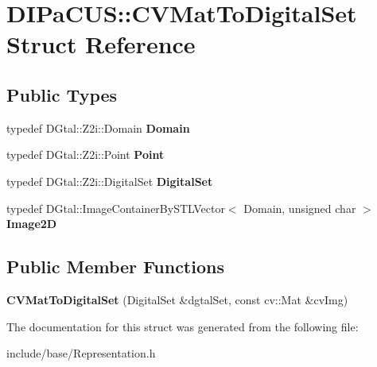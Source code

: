 \hypertarget{structDIPaCUS_1_1CVMatToDigitalSet}{}\section{D\+I\+Pa\+C\+US\+:\+:C\+V\+Mat\+To\+Digital\+Set Struct Reference}
\label{structDIPaCUS_1_1CVMatToDigitalSet}
\subsection*{Public Types}
\begin{DoxyCompactItemize}
\item 
\mbox{\label{structDIPaCUS_1_1CVMatToDigitalSet_ac8b0764da8c7668e5f1ca3d336d3f2de}} 
typedef D\+Gtal\+::\+Z2i\+::\+Domain {\bfseries Domain}
\item 
\mbox{\label{structDIPaCUS_1_1CVMatToDigitalSet_a8d29525418cf7a721290e9ad38bac822}} 
typedef D\+Gtal\+::\+Z2i\+::\+Point {\bfseries Point}
\item 
\mbox{\label{structDIPaCUS_1_1CVMatToDigitalSet_aa57ae4169b2ebbaa6af9ce9de89092e1}} 
typedef D\+Gtal\+::\+Z2i\+::\+Digital\+Set {\bfseries Digital\+Set}
\item 
\mbox{\label{structDIPaCUS_1_1CVMatToDigitalSet_af42f2253ec34d0da41c1938c0b0f1813}} 
typedef D\+Gtal\+::\+Image\+Container\+By\+S\+T\+L\+Vector$<$ Domain, unsigned char $>$ {\bfseries Image2D}
\end{DoxyCompactItemize}
\subsection*{Public Member Functions}
\begin{DoxyCompactItemize}
\item 
\mbox{\label{structDIPaCUS_1_1CVMatToDigitalSet_a9ffad21fb65a81d6fae3969ee98dd484}} 
{\bfseries C\+V\+Mat\+To\+Digital\+Set} (Digital\+Set \&dgtal\+Set, const cv\+::\+Mat \&cv\+Img)
\end{DoxyCompactItemize}


The documentation for this struct was generated from the following file\+:\begin{DoxyCompactItemize}
\item 
include/base/Representation.\+h\end{DoxyCompactItemize}
